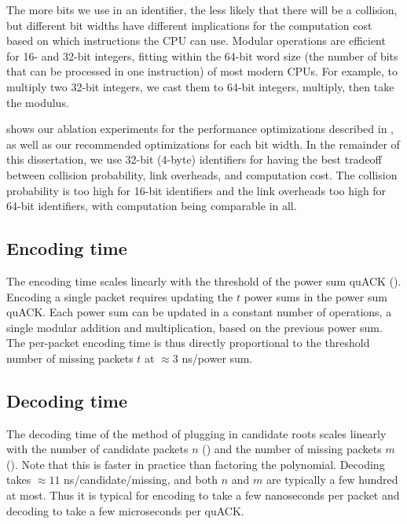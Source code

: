 

The more bits we use in an identifier, the less likely that there will be a
collision, but different bit widths have different implications for the
computation cost based on which instructions the CPU can use. Modular
operations are efficient for 16- and 32-bit integers, fitting within the 64-bit
word size (the number of bits that can be processed in one instruction) of most
modern CPUs. For example, to multiply two 32-bit integers, we cast them to
64-bit integers, multiply, then take the modulus.

 shows our ablation experiments for the
performance optimizations described in ,
as well as our recommended optimizations for each bit width. In the
remainder of this dissertation, we use 32-bit (4-byte) identifiers for having
the best tradeoff between collision probability, link overheads, and computation
cost. The collision probability is too high for 16-bit identifiers and the link
overheads too high for 64-bit identifiers, with computation being comparable
in all.

\subsection{Encoding time}
\label{sec:quack:psum-microbenchmarks:encoding}



The encoding time scales linearly with the threshold of the power sum quACK
(). Encoding a single packet requires
updating the $t$ power sums in the power sum quACK. Each power sum can be
updated in a constant number of operations, a single modular addition and
multiplication, based on the previous power sum. The per-packet encoding time
is thus directly proportional to the threshold number of missing packets $t$ at
$\approx 3$ ns/power sum.

\subsection{Decoding time}
\label{sec:quack:psum-microbenchmarks:decoding}



The decoding time of the method of plugging in candidate roots scales linearly with the number of
candidate packets $n$ ()
and the number of missing packets $m$ ().
Note that this is faster in practice than factoring the polynomial.
Decoding takes $\approx 11$ ns/candidate/missing, and both $n$ and $m$ are
typically a few hundred at most.
Thus it is typical for encoding to take a few nanoseconds per packet and
decoding to take a few microseconds per quACK.

